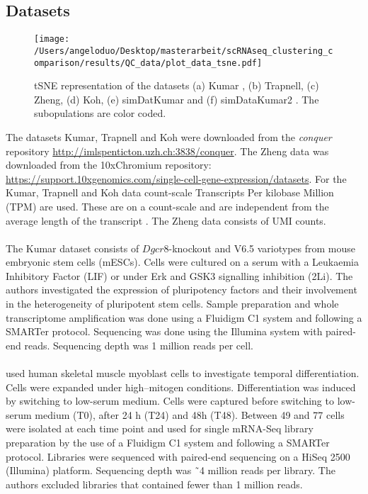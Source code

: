 \documentclass[12pt, a4paper]{article}\usepackage[]{graphicx}\usepackage[]{color}
\begin{document}
\newpage
\subsection{Datasets}

\begin{figure}[!h]
\texttt{[image: /Users/angeloduo/Desktop/masterarbeit/scRNAseq\_clustering\_comparison/results/QC\_data/plot\_data\_tsne.pdf]}
\caption{tSNE representation of the datasets (a) Kumar , (b) Trapnell, (c) Zheng, (d) Koh, (e) simDatKumar and  (f) simDataKumar2 . The subopulations are color coded.  }
\label{fig:datatsne}
\end{figure}

The datasets Kumar, Trapnell and Koh were downloaded from the \textit{conquer} repository \url{http://imlspenticton.uzh.ch:3838/conquer}. The Zheng data was downloaded from the 10xChromium repository: \url{https://support.10xgenomics.com/single-cell-gene-expression/datasets}. For the Kumar, Trapnell and Koh data count-scale Transcripts Per kilobase Million (TPM) are used.  These are on a count-scale and are independent from the average length of the transcript \citep{soneson2015differential}. The Zheng data consists of UMI counts.
\paragraph{\citet{kumar2014deconstructing}}
The Kumar dataset consists of $Dgcr8$-knockout and V6.5 variotypes from mouse embryonic stem cells (mESCs). Cells were cultured on a serum with a Leukaemia Inhibitory Factor (LIF) or under Erk and GSK3 signalling inhibition (2Li). The authors investigated the expression of pluripotency factors and their involvement in the heterogeneity of pluripotent stem cells. Sample preparation and whole transcriptome amplification was done using a Fluidigm C1 system and following a SMARTer protocol. Sequencing was done using the Illumina system with paired-end reads. Sequencing depth was 1 million reads per cell.
\paragraph{\citet{trapnell2014dynamics}} 
\citet{trapnell2014dynamics} used human skeletal muscle myoblast cells to investigate temporal differentiation. Cells were expanded under high--mitogen conditions. Differentiation was induced by switching to low-serum medium. Cells were captured before switching to low-serum medium (T0), after 24 h (T24) and 48h (T48). Between 49 and 77 cells were isolated at each time point and used for single mRNA-Seq library preparation by the use of a Fluidigm C1 system and following a SMARTer protocol. Libraries were sequenced with paired-end sequencing on a HiSeq 2500 (Illumina) platform. Sequencing depth was ˜4 million reads per library. The authors excluded libraries that contained fewer than 1 million reads. 
\end{document}
